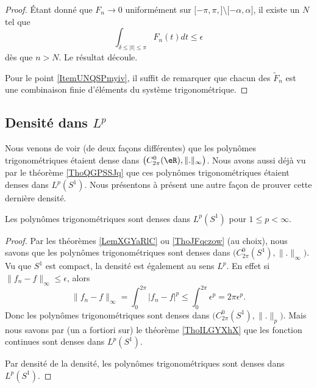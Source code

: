 \begin{proof}
    Étant donné que \( F_n\to 0\) uniformément sur \( \mathopen[ -\pi,\pi ,  \mathclose]\setminus\mathopen[ -\alpha , \alpha \mathclose]\), il existe un \( N\) tel que 
    \begin{equation}
        \int_{\delta\leq| t |\leq \pi}F_n(t)dt\leq \epsilon
    \end{equation}
    dès que \( n>N\). Le résultat découle.

    Pour le point \ref{ItemUNQSPmyiv}, il suffit de remarquer que chacun des \( \tilde F_n\) est une combinaison finie d'éléments du système trigonométrique.
\end{proof}

\subsection{Densité dans \texorpdfstring{$ L^p$}{Lp}}

Nous venons de voir (de deux façons différentes) que les polynômes trigonométriques étaient dense dans \( \big( C^0_{2\pi}(\eR),\| . \|_{\infty} \big)\). Nous avons aussi déjà vu par le théorème \ref{ThoQGPSSJq} que ces polynômes trigonométriques étaient denses dans \( L^p(S^1)\). Nous présentons à présent une autre façon de prouver cette dernière densité.

\begin{theorem}     \label{ThoDPTwimI}
    Les polynômes trigonométriques sont denses dans \( L^p(S^1)\) pour \( 1\leq p <\infty\).
\end{theorem}

\begin{proof}
    Par les théorèmes \ref{LemXGYaRlC} ou \ref{ThoJFqczow} (au choix), nous savons que les polynômes trigonométriques sont denses dans \( \big( C^0_{2\pi}(S^1),\| . \|_{\infty} \big)\). Vu que \( S^1\) est compact, la densité est également au sens \( L^p\). En effet si \( \| f_n-f \|_{\infty}\leq \epsilon\), alors
    \begin{equation}
        \| f_n-f \|_{\infty}=\int_0^{2\pi}| f_n-f |^p\leq\int_0^{2\pi}\epsilon^p=2\pi\epsilon^p.
    \end{equation}
    Donc les polynômes trigonométriques sont denses dans \( \big( C^0_{2\pi}(S^1),\| . \|_p \big)\). Mais nous savons par (un a fortiori sur) le théorème \ref{ThoILGYXhX} que les fonction continues sont denses dans \( L^p(S^1)\). 

    Par densité de la densité, les polynômes trigonométriques sont denses dans \( L^p(S^1)\).
\end{proof}

